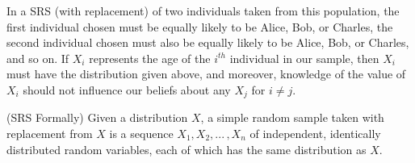 \begin{center}
    \begin{minipage}{.45\textwidth}
       \centering
      \renewcommand*{\arraystretch}{1.35}
\renewcommand*{\arraystretch}{1}
\vspace{1em}
    \end{minipage}%
    \begin{minipage}{0.5\textwidth}
        \centering
{}
\end{minipage}
\end{center}

\par
In a SRS (with replacement) of two individuals taken from this population, the first individual chosen must be equally likely to be Alice, Bob, or Charles, the second individual chosen must also be equally likely to be Alice, Bob, or Charles, and so on. If $X_i$ represents the age of the $i^{th}$ individual in our sample, then $X_i$ must have the distribution given above, and moreover, knowledge of the value of $X_i$ should not influence our beliefs about any $X_j$ for $i \neq j$.
\par
\begin{defn}\label{FormalSRSDef} (SRS Formally) Given a distribution $X$, a simple random sample taken with replacement from $X$ is a sequence $X_1, X_2, ... \,, X_n$ of independent, identically distributed random variables, each of which has the same distribution as $X$.
\end{defn}

